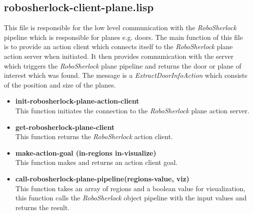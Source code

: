 \documentclass[main.tex]{subfiles}
\begin{document}
        \subsection{robosherlock-client-plane.lisp}
        This file is responsible for the low level communication with the \textit{RoboSherlock} pipeline which is responsible for planes e.g. doors. The main function of this file is to provide an action client which connects itself to the \textit{RoboSherlock} plane action server when initiated. It then provides communication with the server which triggers the \textit{RoboSherlock} plane pipeline and returns the door or plane of interest which was found. The message is a \textit{ExtractDoorInfoAction} which consists of the position and size of the planes.
        \begin{itemize}
            \item \textbf{init-robosherlock-plane-action-client} \\
            This function initiates the connection to the \textit{RoboSherlock} plane action server.
            \item \textbf{get-robosherlock-plane-client} \\
            This function returns the \textit{RoboSherlock} action client.
            \item \textbf{make-action-goal (in-regions in-visualize)} \\
            This function makes and returns an action client goal.
            \item \textbf{call-robosherlock-plane-pipeline(regions-value, viz)} \\
            This function takes an array of regions and a boolean value for visualization, this function calls the \textit{RoboSherlock} object pipeline with the input values and returns the result.
        \end{itemize}
    \endgroup
\end{document}
